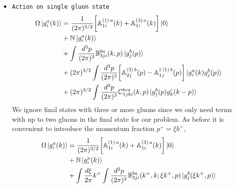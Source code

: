 \documentclass[10pt]{article}
\def\mf#1{\mathbb{#1}}
\numberwithin{equation}{section}
\begin{document}
\begin{itemize}
\begin{align}
   +\frac{1}{2\pi}\int dp^{+}\,  dq^{+} \, \int d^{2}z\, d^{2}x\, \mf{B}^{cb}_{2kj}(p^{+},-z;q^{+},-x)\ket{g^{b}_{j}(p^{+},z)g^{c}_{k}(q^{+},x)}%
\end{align}
Similarly, changing to the momentum fraction,  
\begin{align} \label{Omegaonvacposzeta}
    \Omega\ket{0} & = \mf{N}\ket{0} \notag \\ &
    + \frac{1}{(2\pi)^{1/2}}\int dp^{+} \int d^{2}x\,
    \bigg[\mf{A}^{(3)\, b}_{2j}(p^{+}, -x)
   -\mf{A}^{\dagger\,(1)\, b}_{1j}(p^{+},x)\bigg]\ket{g^{b}_{j}(p^{+},x)} \notag \\ & 
 +\frac{1}{2\pi}\int dk^{+} k^+  \int d \xi  \int d^{2}z d^{2}x\, \mf{B}^{cb}_{2kj}(\xi k^{+},-z; (1-\xi) k^{+},-x)\ket{g^{b}_{j}(\xi k^{+},z),\,g^{c}_{k}((1-\xi)k^{+},x)}
\end{align}
These relations will help us fix coefficients $ \mf{N}$, $\mf{A}^{(1)}$, $\mf{A}^{(3)}$ and $\mf{B}_{2}$. 
The remaining two coefficients can be fixed by considering $\Omega$ acting on a single gluon state. 
\item{\texttt{Action on single gluon state}} 
\begin{align}\label{Omegaongmom}
    \Omega\ket{g^{a}_{i}(k)} & =  \frac{1}{(2\pi)^{3/2}} \bigg[\mf{A}^{(1)\, a}_{1i}(k)+\mf{A}^{(3)\, a}_{1i}(k)\bigg]\ket{0} \notag \\ &
   + \mf{N}\ket{g^{a}_{i}(k)} \notag \\ & 
    +\int  \frac{d^3p}{(2\pi)^3} \mf{B} ^{ba}_{3ji}(k,p)\ket{g^{b}_{j}(p)} \notag \\ & 
    + (2\pi)^{3/2}\int \frac{d^3p}{(2\pi)^3}  \bigg[\mf{A}^{(3)\, b}_{2j}(p) - \mf{A}^{\dagger\, (1)\, b}_{1j}(p)\bigg]  \ket{g^{a}_{i}(k)g^{b}_{j}(p)} \notag \\ & 
    + (2\pi)^{3/2}\int \frac{d^3p}{(2\pi)^3} \mf{C}^{bca}_{1jki}(k,p)\ket{g^{b}_{j}(p)g^{c}_{k}(k-p)}
\end{align}
We ignore final states with three or more gluons since we only need terms with up to two gluons in the final state for our problem. As before it is convenient to introduce the momentum fraction  $p^{+} = \xi k^{+}$,
\begin{align}\label{Omegaongmomzeta}
    \Omega\ket{g^{a}_{i}(k)} & = \frac{1}{(2\pi)^{3/2}} \bigg[\mf{A}^{(1)\, a}_{1i}( k)+\mf{A}^{(3)\, a}_{1i}(k)\bigg]\ket{0} \notag \\ & 
   +  \mf{N}\ket{g^{a}_{i}(k)} \notag \\ & 
    + \int \frac{d\xi}{2\pi}k^{+}\int  \frac{d^{2}p}{(2\pi)^2} \mf{B} ^{ba}_{3ji}(k^{+},k; \xi k^{+},p)\ket{g^{b}_{j}(\xi k^{+},p)} \notag \\ & 

\end{align}
\end{itemize}
\end{document}
